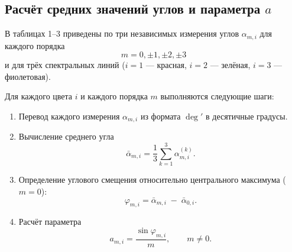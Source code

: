 \subsection*{Расчёт средних значений углов и параметра \(a\)}

В таблицах 1–3 приведены по три независимых измерения углов \(\alpha_{m,i}\) для каждого порядка
\[
	m = 0, \pm1, \pm2, \pm3
\]
и для трёх спектральных линий (\(i=1\) — красная, \(i=2\) — зелёная, \(i=3\) — фиолетовая).

Для каждого цвета \(i\) и каждого порядка \(m\) выполняются следующие шаги:
\begin{enumerate}
	\item Перевод каждого измерения \(\alpha_{m,i}\) из формата \(\deg'\) в десятичные градусы.
	\item Вычисление среднего угла
	      \[
		      \bar\alpha_{m,i}
		      = \frac{1}{3}\sum_{k=1}^{3}\alpha_{m,i}^{(k)}.
	      \]
	\item Определение углового смещения относительно центрального максимума (\(m=0\)):
	      \[
		      \varphi_{m,i}
		      = \bar\alpha_{m,i} \;-\; \bar\alpha_{0,i}.
	      \]
	\item Расчёт параметра
	      \[
		      a_{m,i}
		      = \frac{\sin\varphi_{m,i}}{m},
		      \qquad m\neq 0.
	      \]
\end{enumerate}
